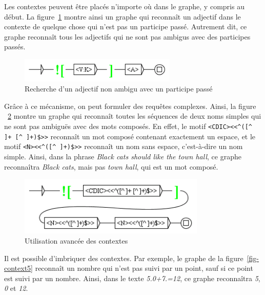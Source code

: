 \bigskip
\noindent Les contextes peuvent être placés n’importe où dans le graphe, y compris au début. La
figure~\ref{fig-context3} montre ainsi un graphe qui reconnaît un adjectif dans le contexte de
quelque
chose qui n’est pas un participe passé. Autrement dit, ce graphe reconnaît tous les adjectifs
qui ne sont pas ambigus avec des participes passés.


\bigskip
\begin{figure}[!h]
\begin{center}
\includegraphics[width=7.5cm]{resources/img/fig6-14.png}
\caption{Recherche d’un adjectif non ambigu avec un participe passé\label{fig-context3}}
\end{center}
\end{figure}

\bigskip
\noindent Grâce à ce mécanisme, on peut formuler des requêtes complexes. Ainsi, la figure
~\ref{fig-context4} montre un graphe qui reconnaît toutes les séquences de deux noms simples qui ne
sont pas ambiguës avec des mots composés. En effet, le motif \verb?<CDIC><<^([^ ]+ [^ ]+)$>>? 
reconnaît un mot composé contenant exactement un espace, et le motif \verb?<N><<^([^ ]+)$>>?
reconnaît un nom sans espace, c’est-à-dire un nom simple. Ainsi,
 dans la phrase \textit{Black cats should like the town hall}, ce graphe reconnaîtra
 \textit{Black cats}, mais pas \textit{town hall}, qui est un mot composé.


\bigskip
\begin{figure}[!h]
\begin{center}
\includegraphics[width=8.9cm]{resources/img/fig6-15.png}
\caption{Utilisation avancée des contextes\label{fig-context4}}
\end{center}
\end{figure}

\bigskip
\noindent Il est possible d’imbriquer des contextes. Par exemple, le graphe de la
figure~\ref{fig-context5}
reconnaît un nombre qui n’est pas suivi par un point, sauf si ce point est suivi par un nombre.
Ainsi, dans le texte \textit{5.0+7.=12}, ce graphe reconnaîtra \textit{5}, \textit{0} et
\textit{12}.

